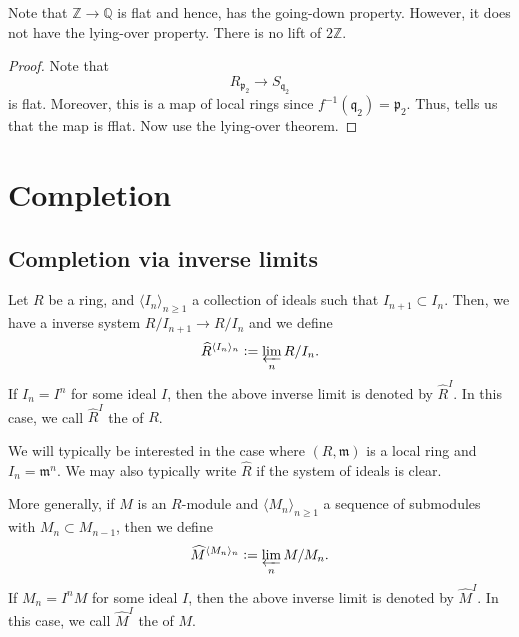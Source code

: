 \documentclass[12pt]{article}
\begin{document}
Note that $\mathbb{Z} \to \mathbb{Q}$ is flat and hence, has the going-down property. However, it does not have the lying-over property. There is no lift of $2 \mathbb{Z}$.

\begin{proof} 
	Note that
	\begin{equation*} 
		R_{\mathfrak{p}_{2}} \to S_{\mathfrak{q}_{2}}
	\end{equation*}
	is flat. Moreover, this is a map of local rings since $f^{-1}(\mathfrak{q}_{2}) = \mathfrak{p}_{2}$. Thus,  tells us that the map is fflat. Now use the lying-over theorem.
\end{proof}

\section{Completion}

\subsection{Completion via inverse limits}

\begin{defn}
	Let $R$ be a ring, and $\langle I_{n} \rangle_{n \ge 1}$ a collection of ideals such that $I_{n + 1} \subset I_{n}$. Then, we have a inverse system $R/I_{n + 1} \to R/I_{n}$ and we define
	\begin{equation*} 
		\widehat{R}^{\langle I_{n} \rangle_{n}} \vcentcolon= \varprojlim_{n} R/I_{n}.
	\end{equation*}
	If $I_{n} = I^{n}$ for some ideal $I$, then the above inverse limit is denoted by $\widehat{R}^{I}$. In this case, we call $\widehat{R}^{I}$ the  of $R$.
\end{defn}

We will typically be interested in the case where $(R, \mathfrak{m})$ is a local ring and $I_{n} = \mathfrak{m}^{n}$. We may also typically write $\widehat{R}$ if the system of ideals is clear.

\begin{defn}
	More generally, if $M$ is an $R$-module and $\langle M_{n} \rangle_{n \ge 1}$ a sequence of submodules with $M_{n} \subset M_{n - 1}$, then we define
	\begin{equation*} 
		\widehat{M}^{\langle M_{n} \rangle_{n}} \vcentcolon= \varprojlim_{n} M/M_{n}.
	\end{equation*}
	If $M_{n} = I^{n} M$ for some ideal $I$, then the above inverse limit is denoted by $\widehat{M}^{I}$. In this case, we call $\widehat{M}^{I}$ the  of $M$.
\end{defn}
\end{document}
